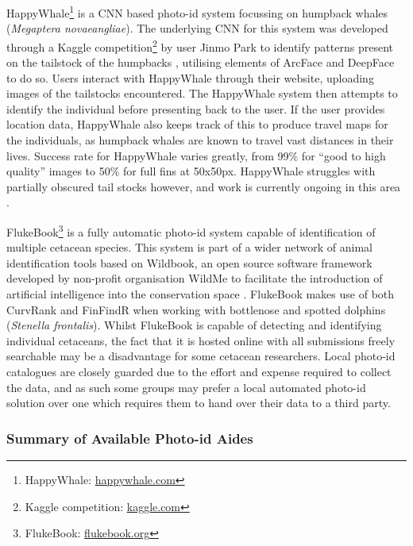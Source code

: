 HappyWhale\footnote{\label{footnote:happyWhale}HappyWhale: \href{https://happywhale.com/}{happywhale.com}} is a CNN based photo-id system focussing on humpback whales (\textit{Megaptera novaeangliae}). The underlying CNN for this system was developed through a Kaggle competition\footnote{Kaggle competition: \href{https://www.kaggle.com/c/whale-categorization-playground}{kaggle.com}} by user Jinmo Park to identify patterns present on the tailstock of the humpbacks \cite{kaggle_humpback_2018}, utilising elements of ArcFace \cite{deng_arcface_2019} and DeepFace \cite{taigman_deepface_2014} to do so. Users interact with HappyWhale through their website, uploading images of the tailstocks encountered. The HappyWhale system then attempts to identify the individual before presenting back to the user. If the user provides location data, HappyWhale also keeps track of this to produce travel maps for the individuals, as humpback whales are known to travel vast distances in their lives. Success rate for HappyWhale varies greatly, from 99\% for ``good to high quality'' images to 50\% for full fins at 50x50px. HappyWhale struggles with partially obscured tail stocks however, and work is currently ongoing in this area \cite{cheeseman_happywhale_2019}. 

FlukeBook\footnote{\label{footnote:flukeBook}FlukeBook: \href{https://www.flukebook.org/}{flukebook.org}} is a fully automatic photo-id system capable of identification of multiple cetacean species. This system is part of a wider network of animal identification tools based on Wildbook, an open source software framework developed by non-profit organisation WildMe to facilitate the introduction of artificial intelligence into the conservation space \cite{berger-wolf_wildbook:_2017}. FlukeBook makes use of both CurvRank and FinFindR when working with bottlenose and spotted dolphins (\textit{Stenella frontalis}). Whilst FlukeBook is capable of detecting and identifying individual cetaceans, the fact that it is hosted online with all submissions freely searchable may be a disadvantage for some cetacean researchers. Local photo-id catalogues are closely guarded due to the effort and expense required to collect the data, and as such some groups may prefer a local automated photo-id solution over one which requires them to hand over their data to a third party. 

\subsubsection{Summary of Available Photo-id Aides}\label{ch:Background,sec:conTech,sub:photoIDAides,subsub:Summary}

